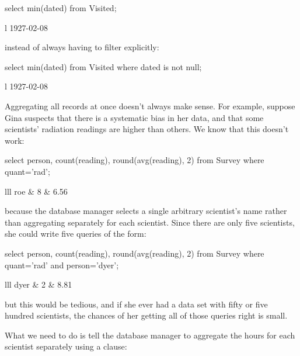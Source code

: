 \begin{VerbIn}
select min(dated) from Visited;
\end{VerbIn}

\begin{sqltable}{l}
1927-02-08 \\
\end{sqltable}

instead of always having to filter explicitly:

\begin{VerbIn}
select min(dated) from Visited where dated is not null;
\end{VerbIn}

\begin{sqltable}{l}
1927-02-08 \\
\end{sqltable}

Aggregating all records at once doesn't always make sense. For example,
suppose Gina suspects that there is a systematic bias in her data, and
that some scientists' radiation readings are higher than others. We know
that this doesn't work:

\begin{VerbIn}
select person, count(reading), round(avg(reading), 2)
from  Survey
where quant='rad';
\end{VerbIn}

\begin{sqltable}{lll}
roe & 8 & 6.56 \\
\end{sqltable}

because the database manager selects a single arbitrary scientist's name
rather than aggregating separately for each scientist. Since there are
only five scientists, she could write five queries of the form:

\begin{VerbIn}
select person, count(reading), round(avg(reading), 2)
from  Survey
where quant='rad'
and   person='dyer';
\end{VerbIn}

\begin{sqltable}{lll}
dyer & 2 & 8.81 \\
\end{sqltable}

but this would be tedious, and if she ever had a data set with fifty or
five hundred scientists, the chances of her getting all of those queries
right is small.

What we need to do is tell the database manager to aggregate the hours
for each scientist separately using a  clause:

